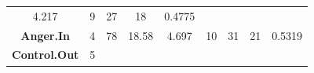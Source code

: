 \documentclass[]{article}
\theoremstyle{definition}
\theoremstyle{definition}
\theoremstyle{definition}
\theoremstyle{remark}
\begin{document}
\begin{longtable}[]{@{}ccccccccc@{}}
\begin{minipage}[t]{0.08\columnwidth}
4.217\strut
\end{minipage} & \begin{minipage}[t]{0.06\columnwidth}\centering\strut
9\strut
\end{minipage} & \begin{minipage}[t]{0.06\columnwidth}\centering\strut
27\strut
\end{minipage} & \begin{minipage}[t]{0.08\columnwidth}\centering\strut
18\strut
\end{minipage} & \begin{minipage}[t]{0.08\columnwidth}\centering\strut
0.4775\strut
\end{minipage}\tabularnewline
\begin{minipage}[t]{0.22\columnwidth}\centering\strut
\textbf{Anger.In}\strut
\end{minipage} & \begin{minipage}[t]{0.07\columnwidth}\centering\strut
4\strut
\end{minipage} & \begin{minipage}[t]{0.05\columnwidth}\centering\strut
78\strut
\end{minipage} & \begin{minipage}[t]{0.08\columnwidth}\centering\strut
18.58\strut
\end{minipage} & \begin{minipage}[t]{0.08\columnwidth}\centering\strut
4.697\strut
\end{minipage} & \begin{minipage}[t]{0.06\columnwidth}\centering\strut
10\strut
\end{minipage} & \begin{minipage}[t]{0.06\columnwidth}\centering\strut
31\strut
\end{minipage} & \begin{minipage}[t]{0.08\columnwidth}\centering\strut
21\strut
\end{minipage} & \begin{minipage}[t]{0.08\columnwidth}\centering\strut
0.5319\strut
\end{minipage}\tabularnewline
\begin{minipage}[t]{0.22\columnwidth}\centering\strut
\textbf{Control.Out}\strut
\end{minipage} & \begin{minipage}[t]{0.07\columnwidth}\centering\strut
5\strut
\end{minipage} & \begin{minipage}[t]{0.05\columnwidth}\centering\strut

\end{minipage}
\end{longtable}
\end{document}

